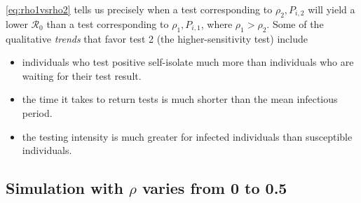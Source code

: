 \documentclass[12pt]{article}
\newcommand{\Rnum}{\ensuremath{\mathcal{R}_0}}
\DeclareRobustCommand\_{\ifmmode\expandafter\subtxt\else\textunderscore\fi}
\theoremstyle{definition} %
\begin{document}
\cref{eq:rho1vsrho2} tells us precisely when a test corresponding to $\rho_2, P_{i,2}$ will yield a lower $\Rnum$ than a test corresponding to $\rho_1, P_{i,1}$, where $\rho_1 > \rho_2$. Some of the qualitative \textit{trends} that favor test 2 (the higher-sensitivity test) include

\begin{itemize}
    \item individuals who test positive self-isolate much more than individuals who are waiting for their test result.
    \item the time it takes to return tests is much shorter than the mean infectious period.
    \item the testing intensity is much greater for infected individuals than susceptible individuals.
\end{itemize}

\subsection{Simulation with $\rho$ varies from 0 to 0.5 }
\end{document}
